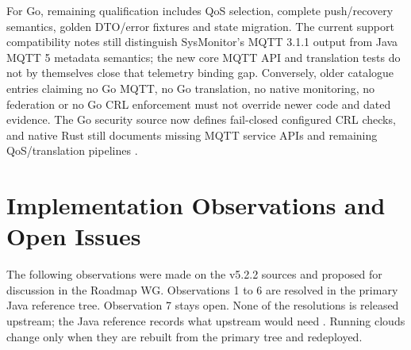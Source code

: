 \documentclass[a4paper]{arrowhead}
\begin{document}
For Go, remaining qualification includes QoS selection, complete push/recovery
semantics, golden DTO/error fixtures and state migration. The current support
compatibility notes still distinguish SysMonitor's MQTT 3.1.1 output from Java
MQTT 5 metadata semantics; the new core MQTT API and translation tests do not by
themselves close that telemetry binding gap. Conversely, older catalogue entries
claiming no Go MQTT, no Go translation, no native monitoring, no federation or
no Go CRL enforcement must not override newer code and dated evidence. The Go
security source now defines fail-closed configured CRL checks, and native Rust
still documents missing MQTT service APIs and remaining QoS/translation pipelines
\cite{nativeCompatibility20261024,goMqtt20261024,rustFederation20261019}.

\section{Implementation Observations and Open Issues}
\label{sec:issues}

The following observations were made on the v5.2.2 sources and proposed for discussion in
the Roadmap WG. Observations 1 to 6 are resolved in the primary Java reference tree.
Observation 7 stays open. None of the resolutions is released upstream; the Java
reference records what upstream would need \cite{javaConformance20261107}. Running clouds
change only when they are rebuilt from the primary tree and redeployed.
\end{document}
